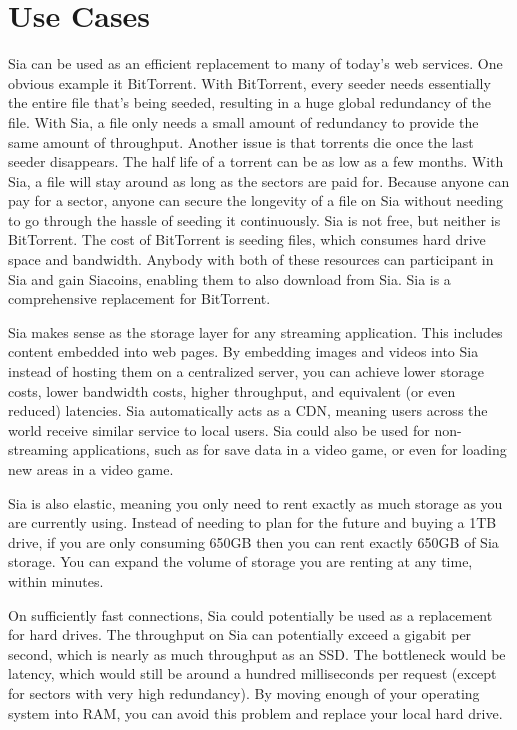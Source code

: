 \documentclass[twocolumn]{article}
\begin{document}
\section{Use Cases}

Sia can be used as an efficient replacement to many of today's web services.
One obvious example it BitTorrent.
With BitTorrent, every seeder needs essentially the entire file that's being seeded, resulting in a huge global redundancy of the file.
With Sia, a file only needs a small amount of redundancy to provide the same amount of throughput.
Another issue is that torrents die once the last seeder disappears.
The half life of a torrent can be as low as a few months.
With Sia, a file will stay around as long as the sectors are paid for.
Because anyone can pay for a sector, anyone can secure the longevity of a file on Sia without needing to go through the hassle of seeding it continuously.
Sia is not free, but neither is BitTorrent.
The cost of BitTorrent is seeding files, which consumes hard drive space and bandwidth.
Anybody with both of these resources can participant in Sia and gain Siacoins, enabling them to also download from Sia.
Sia is a comprehensive replacement for BitTorrent.

Sia makes sense as the storage layer for any streaming application.
This includes content embedded into web pages.
By embedding images and videos into Sia instead of hosting them on a centralized server, you can achieve lower storage costs, lower bandwidth costs, higher throughput, and equivalent (or even reduced) latencies.
Sia automatically acts as a CDN, meaning users across the world receive similar service to local users.
Sia could also be used for non-streaming applications, such as for save data in a video game, or even for loading new areas in a video game.

Sia is also elastic, meaning you only need to rent exactly as much storage as you are currently using.
Instead of needing to plan for the future and buying a 1TB drive, if you are only consuming 650GB then you can rent exactly 650GB of Sia storage.
You can expand the volume of storage you are renting at any time, within minutes.

On sufficiently fast connections, Sia could potentially be used as a replacement for hard drives.
The throughput on Sia can potentially exceed a gigabit per second, which is nearly as much throughput as an SSD.
The bottleneck would be latency, which would still be around a hundred milliseconds per request (except for sectors with very high redundancy).
By moving enough of your operating system into RAM, you can avoid this problem and replace your local hard drive.
\end{document}
